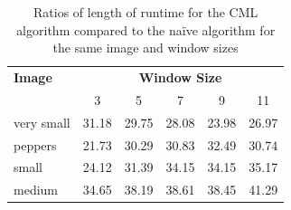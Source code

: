 \begin{table}
\centering
\caption{Ratios of length of runtime for the CML algorithm compared to the naïve algorithm for the same image and window sizes}
\label{tab:median:ratcml}
\begin{tabular}{@{}lccccc@{}}
\toprule
\textbf{Image} & \multicolumn{5}{c}{\textbf{Window Size}} \\
               & 3      & 5      & 7      & 9     & 11    \\ \midrule
very small     & 31.18  & 29.75  & 28.08  & 23.98 & 26.97 \\
peppers        & 21.73  & 30.29  & 30.83  & 32.49 & 30.74 \\
small          & 24.12  & 31.39  & 34.15  & 34.15 & 35.17 \\
medium         & 34.65  & 38.19  & 38.61  & 38.45 & 41.29 \\ \bottomrule
\end{tabular}
\end{table}


